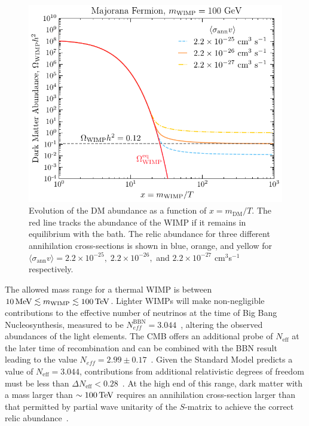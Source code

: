 \begin{figure}[t!]
    \centering
    \includegraphics{fig_dm_freezeout.pdf}
    \caption[Evolution of the DM abundance as a function of $x = m_\mathrm{DM}/T$.]{Evolution of the DM abundance as a function of $x = m_\mathrm{DM}/T$. The red line tracks the abundance of the WIMP if it remains in equilibrium with the bath. The relic abundance for three different annihilation cross-sections is shown in blue, orange, and yellow for $\langle \sigma_\mathrm{ann} v\rangle = 2.2\times10^{-25},\;2.2\times10^{-26},$ and $2.2\times10^{-27}$ cm$^{3}$s$^{-1}$ respectively.}
    \label{ch1:fig:WIMP_freezeout}
\end{figure}

The allowed mass range for a thermal WIMP is between $10{\rm \,MeV}\lesssim m_\mathrm{WIMP} \lesssim 100{\rm \,TeV}$. Lighter WIMPs will make non-negligible contributions to the effective number of neutrinos at the time of Big Bang Nucleosynthesis, measured to be $N^\mathrm{BBN}_{eff} = 3.044$~\cite{Yeh:2022heq_oct_Probingphysicsstandard}, altering the observed abundances of the light elements. The CMB offers an additional probe of $N_\mathrm{eff}$ at the later time of recombination and can be combined with the BBN result leading to the value $N_{eff} = 2.99 \pm 0.17$~\cite{Planck:2018vyg_sep_Planck2018results}. Given the Standard Model predicts a value of $N_\mathrm{eff} = 3.044$, contributions from additional relativistic degrees of freedom must be less than $\Delta N_\mathrm{eff} < 0.28$~\cite{Yeh:2022heq_oct_Probingphysicsstandard}.  
At the high end of this range, dark matter with a mass larger than $\sim 100{\rm \,TeV}$ requires an annihilation cross-section larger than that permitted by partial wave unitarity of the $S$-matrix to achieve the correct relic abundance~\cite{Griest:1989wd_UnitarityLimitsMass}.  
 

